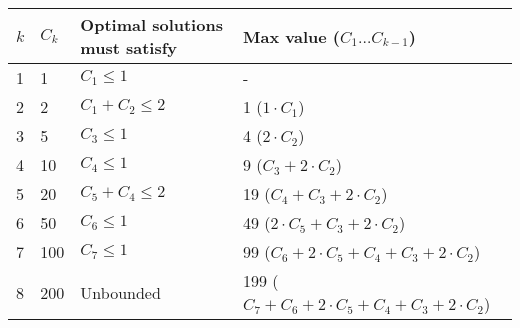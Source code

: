 \documentclass[11pt]{article}
\begin{document}
\begin{flushleft}
	\begin{center}
		\begin{tabular}{ | l | l | p{8cm} | p{6cm} |}
			\hline
			$k$ & $C_k$ & Optimal solutions must satisfy & Max value ($C_1 \dots C_{k - 1}$) \\ \hline
			1 & 1 & $C_1 \leq 1$ & - \\
			
			\hline
			2 & 2 & $C_1 + C_2 \leq 2$ & 1 ($1 \cdot C_1$) \\
			
			\hline
			3 & 5 & $C_3 \leq 1$ & 4 ($2\cdot C_2$) \\
			
			\hline
			4 & 10 & $C_4 \leq 1$ & 9 ($C_3 + 2\cdot C_2$) \\
			
			\hline
			5 & 20 & $C_5 + C_4 \leq 2$ & 19 ($C_4 + C_3 + 2\cdot C_2$) \\
			
			\hline
			6  & 50 & $C_6 \leq1$ & 49 ($2\cdot C_5 + C_3 + 2\cdot C_2$) \\
			
			\hline
			7 & 100 & $C_7 \leq 1$ & 99 ($C_6 + 2\cdot C_5 + C_4 + C_3 + 2 \cdot C_2$) \\
			
			\hline 
			8 & 200 & Unbounded & 199 ($C_7 + C_6 + 2\cdot C_5 + C_4 + C_3 + 2 \cdot C_2$)\\
			
			\hline
		\end{tabular}
	\end{center}
	

\end{flushleft}
\end{document}
